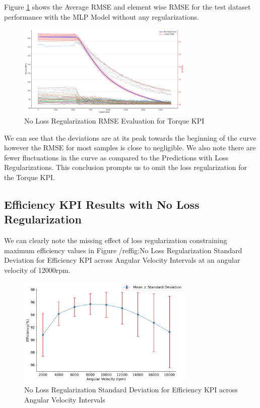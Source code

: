 \documentclass{report} %
\begin{document}
Figure \ref{fig:No Loss Regularization RMSE Evaluation for 2D KPI(Torque)} shows the Average \ac{RMSE} and element wise \ac{RMSE} for the test dataset 
performance with the MLP Model without any regularizations.

\begin{figure}[H]
    \centering
    \includegraphics[width=0.75\textwidth]{./ReportImages/RMSE_MLP_no_lossreg_y1.png} 
    \caption{No Loss Regularization \ac{RMSE} Evaluation for Torque \ac{KPI}} 
    \label{fig:No Loss Regularization RMSE Evaluation for 2D KPI(Torque)}
\end{figure}

We can see that the deviations are at its peak towards the beginning of the curve however the \ac{RMSE} for most samples is close to negligible.
We also note there are fewer fluctuations in the curve as compared to the Predictions with Loss Regularizations.
This conclusion prompts us to omit the loss regularization for the Torque \ac{KPI}.

\subsection{Efficiency \ac{KPI} Results with No Loss Regularization}\label{subsec:3D Efficiency Results with No Loss Regularization}

We can clearly note the missing effect of loss regularization constraining maximum efficiency values in Figure 
/ref{fig:No Loss Regularization Standard Deviation for Efficiency KPI across Angular Velocity Intervals} at an angular velocity of 12000rpm.

\begin{figure}[H]
    \centering
    \includegraphics[width=0.75\textwidth]{./ReportImages/stddev_y2_nn_no_lossreg_MLP.png} 
    \caption{No Loss Regularization Standard Deviation for Efficiency \ac{KPI} across Angular Velocity Intervals}
    \label{fig:No Loss Regularization Standard Deviation for Efficiency KPI across Angular Velocity Intervals}
\end{figure}
\end{document}
